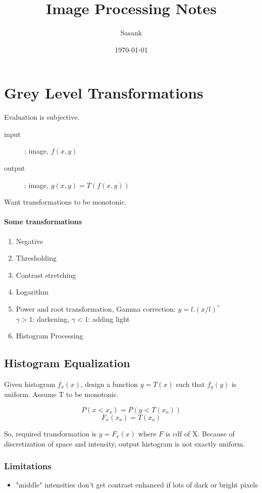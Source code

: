 \documentclass[a4paper,11pt]{article}
\begin{document}
\title{Image Processing Notes}
\author{Sasank}
\date{\today}
\maketitle

\section{Grey Level Transformations}
Evaluation is subjective.
\begin{description}
\item[input]: image, $f(x,y)$
\item[output]: image, $g(x,y) = T(f(x,y))$
\end{description}
Want transformations to be monotonic.

\paragraph{Some transformations}
\begin{enumerate}
\item Negative
\item Thresholding
\item Contrast stretching
\item Logarithm
\item Power and root transformation, Gamma correction:  $y = l.(x/l)^\gamma$
\\ $\gamma >1$: darkening,  $\gamma < 1$: adding light
\item Histogram Processing
\end{enumerate}

\subsection{Histogram Equalization}
Given histogram $f_x(x)$, design a function $y = T(x)$ such that $f_y(y)$ is uniform. Assume T to be monotonic.

$$P(x<x_o) = P(y<T(x_o))$$
$$F_x(x_o) = T(x_o)$$

So, required transformation is $y = F_x(x)$ where $F$ is cdf of X.
Because of discretization of space and intensity, output histogram is not exactly uniform.

\subsubsection{Limitations}
\begin{itemize}
\item "middle" intensities don't get contrast enhanced if lots of dark or bright pixels
\end{itemize}
\end{document}
